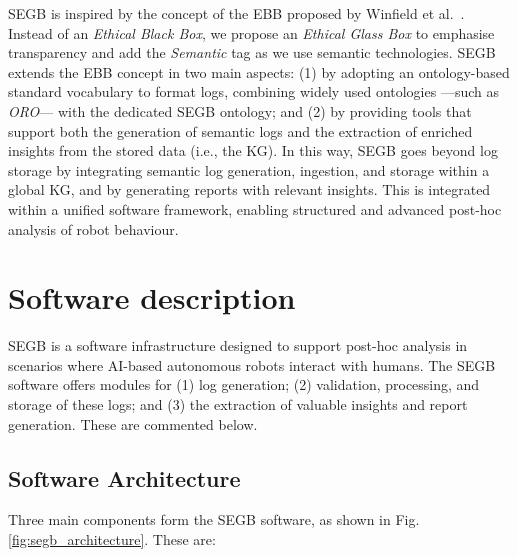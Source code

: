 \documentclass[preprint,12pt, a4paper]{elsarticle}
\begin{document}
\ac{SEGB} is inspired by the concept of the \ac{EBB} proposed by Winfield et al.~\cite{Towards_Autonomous_Robotic_Systems,Winfield2022,winkle2020could}. Instead of an \textit{Ethical Black Box}, we propose an \textit{Ethical Glass Box} to emphasise transparency and add the \textit{Semantic} tag as we use semantic technologies. \ac{SEGB} extends the \ac{EBB} concept in two main aspects: (1) by adopting an ontology-based standard vocabulary to format logs, combining widely used ontologies —such as \textit{ORO}— with the dedicated \ac{SEGB} ontology; and (2) by providing tools that support both the generation of semantic logs and the extraction of enriched insights from the stored data (i.e., the \ac{KG}). In this way, \ac{SEGB} goes beyond log storage by integrating semantic log generation, ingestion, and storage within a global \ac{KG}, and by generating reports with relevant insights. This is integrated within a unified software framework, enabling structured and advanced post-hoc analysis of robot behaviour.


\section{Software description}

\ac{SEGB} is a software infrastructure designed to support post-hoc analysis in scenarios where \ac{AI}-based autonomous robots interact with humans. The \ac{SEGB} software offers modules for (1) log generation; (2) validation, processing, and storage of these logs; and (3) the extraction of valuable insights and report generation. These are commented below.

\subsection{Software Architecture}

Three main components form the \ac{SEGB} software, as shown in Fig. \ref{fig:segb_architecture}. These are:
\end{document}
